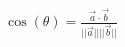 \documentclass[preview]{standalone}
\begin{document}
\begin{align*}
\cos(\theta) = \frac{\vec{a} \cdot \vec{b}}{||\vec{a}|| ||\vec{b}||}
\end{align*}
\end{document}

